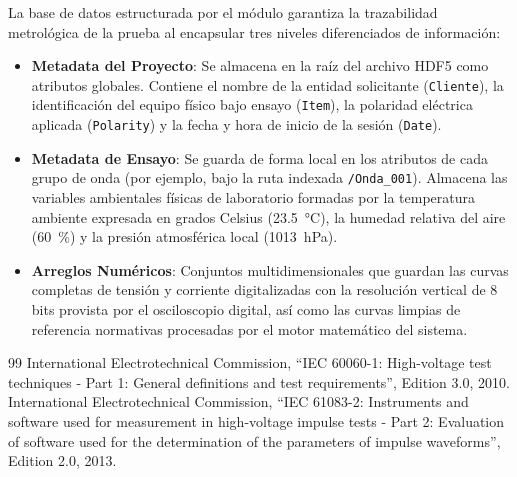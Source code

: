 La base de datos estructurada por el módulo garantiza la trazabilidad metrológica de la prueba al encapsular tres niveles diferenciados de información:
\begin{itemize}
    \item \textbf{Metadata del Proyecto}: Se almacena en la raíz del archivo HDF5 como atributos globales. Contiene el nombre de la entidad solicitante (\texttt{Cliente}), la identificación del equipo físico bajo ensayo (\texttt{Item}), la polaridad eléctrica aplicada (\texttt{Polarity}) y la fecha y hora de inicio de la sesión (\texttt{Date}).
    \item \textbf{Metadata de Ensayo}: Se guarda de forma local en los atributos de cada grupo de onda (por ejemplo, bajo la ruta indexada \texttt{/Onda\_001}). Almacena las variables ambientales físicas de laboratorio formadas por la temperatura ambiente expresada en grados Celsius (\qty{23.5}{\celsius}), la humedad relativa del aire (\qty{60}{\percent}) y la presión atmosférica local (\qty{1013}{\hecto\pascal}).
    \item \textbf{Arreglos Numéricos}: Conjuntos multidimensionales que guardan las curvas completas de tensión y corriente digitalizadas con la resolución vertical de \num{8} bits provista por el osciloscopio digital, así como las curvas limpias de referencia normativas procesadas por el motor matemático del sistema.
\end{itemize}

\begin{thebibliography}{99}
     International Electrotechnical Commission, ``IEC 60060-1: High-voltage test techniques - Part 1: General definitions and test requirements'', Edition 3.0, 2010.
     International Electrotechnical Commission, ``IEC 61083-2: Instruments and software used for measurement in high-voltage impulse tests - Part 2: Evaluation of software used for the determination of the parameters of impulse waveforms'', Edition 2.0, 2013.
\end{thebibliography}